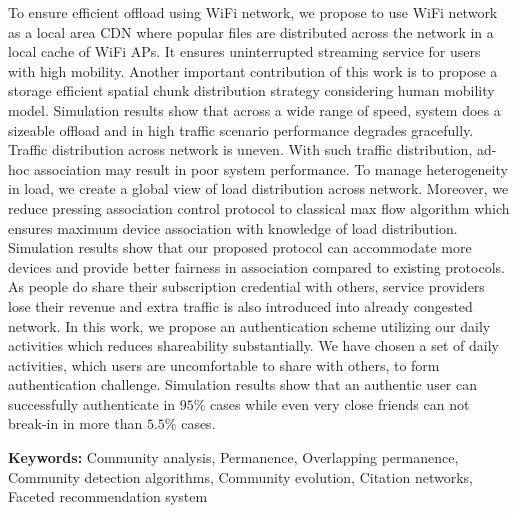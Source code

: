 

\thispagestyle{empty}
\noindent 




\noindent To ensure efficient offload using WiFi network, we propose to use WiFi network as a local area CDN where popular files are distributed across the network in a local cache of WiFi APs. It ensures uninterrupted streaming service for users with high mobility. Another important contribution of this work is to propose a storage efficient spatial chunk distribution strategy considering human mobility model. Simulation results show that across a wide range of speed, system does a sizeable offload and in high traffic scenario performance degrades gracefully.\\



\noindent Traffic distribution across network is uneven. With such traffic distribution, ad-hoc association may result in poor system performance. To manage heterogeneity in load, we create a global view of load distribution across network. Moreover, we reduce pressing association control protocol to classical max flow algorithm which ensures maximum device association with knowledge of load distribution. Simulation results show that our proposed protocol can accommodate more devices and provide better fairness in association compared to existing protocols.\\



\noindent As people do share their subscription credential with others, service providers lose their revenue and extra traffic is also introduced into already congested network. In this work, we propose an authentication scheme utilizing our daily activities which reduces shareability substantially. We have chosen a set of daily activities, which users are uncomfortable to share with others, to form authentication challenge. Simulation results show that an authentic user can successfully authenticate in $95\%$ cases while even very close friends can not break-in in more than $5.5\%$ cases.\\ 



\medskip


\noindent \textbf{Keywords:} Community analysis, Permanence, Overlapping permanence, Community detection algorithms, Community evolution,
Citation networks, Faceted recommendation system
